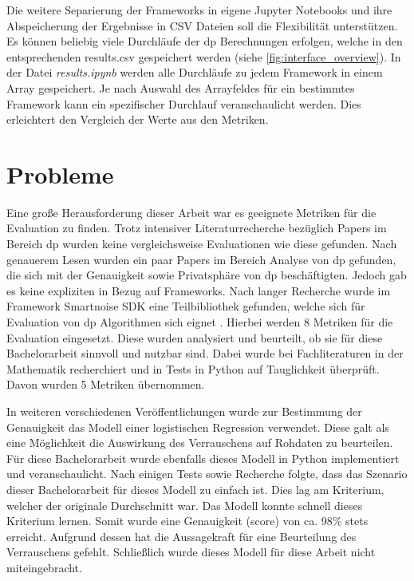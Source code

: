 Die weitere Separierung der Frameworks in eigene Jupyter Notebooks und ihre Abspeicherung der Ergebnisse in CSV Dateien soll die Flexibilität unterstützen. Es können beliebig viele Durchläufe der \gls{dp} Berechnungen erfolgen, welche in den entsprechenden results.csv gespeichert werden (siehe \cref{fig:interface_overview}). In der Datei \textit{results.ipynb} werden alle Durchläufe zu jedem Framework in einem Array gespeichert. Je nach Auswahl des Arrayfeldes für ein bestimmtes Framework kann ein spezifischer Durchlauf veranschaulicht werden. Dies erleichtert den Vergleich der Werte aus den Metriken.

\section{Probleme}
Eine große Herausforderung dieser Arbeit war es geeignete Metriken für die Evaluation zu finden. Trotz intensiver Literaturrecherche bezüglich Papers im Bereich \gls{dp} wurden keine vergleichsweise Evaluationen wie diese gefunden. Nach genauerem Lesen wurden ein paar Papers im Bereich Analyse von \gls{dp} gefunden, die sich mit der Genauigkeit sowie Privatsphäre von \gls{dp} beschäftigten. Jedoch gab es keine expliziten in Bezug auf Frameworks. Nach langer Recherche wurde im Framework Smartnoise SDK eine Teilbibliothek gefunden, welche sich für Evaluation von \gls{dp} Algorithmen sich eignet \parencite{SNEVAL}. Hierbei werden 8 Metriken für die Evaluation eingesetzt. Diese wurden analysiert und beurteilt, ob sie für diese Bachelorarbeit sinnvoll und nutzbar sind. Dabei wurde bei Fachliteraturen in der Mathematik recherchiert und in Tests in Python auf Tauglichkeit überprüft. Davon wurden 5 Metriken übernommen.

In weiteren verschiedenen Veröffentlichungen wurde zur Bestimmung der Genauigkeit das Modell einer logistischen Regression verwendet. Diese galt als eine Möglichkeit die Auswirkung des Verrauschens auf Rohdaten zu beurteilen. Für diese Bachelorarbeit wurde ebenfalls dieses Modell in Python implementiert und veranschaulicht. Nach einigen Tests sowie Recherche folgte, dass das Szenario dieser Bachelorarbeit für dieses Modell zu einfach ist. Dies lag am Kriterium, welcher der originale Durchschnitt war. Das Modell konnte schnell dieses Kriterium lernen. Somit wurde eine Genauigkeit (score) von ca. 98\% stets erreicht. Aufgrund dessen hat die Aussagekraft für eine Beurteilung des Verrauschens gefehlt. Schließlich wurde dieses Modell für diese Arbeit nicht miteingebracht.

